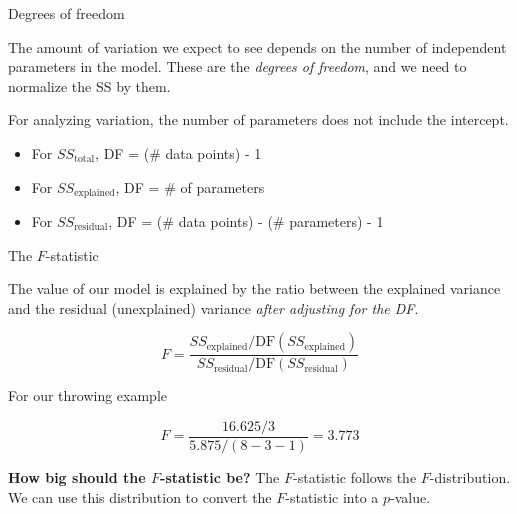\documentclass[10pt]{beamer}\usepackage[]{graphicx}\usepackage[]{color}
\newcommand\sst{SS_\mathrm{total}}
\newcommand\ssx{SS_\mathrm{explained}}
\newcommand\ssr{SS_\mathrm{residual}}
\begin{document}
\begin{frame}[fragile]{Degrees of freedom}

The amount of variation we expect to see depends on the number of independent parameters in the model. These are the \emph{degrees of freedom}, and we need to normalize the SS by them.

For analyzing variation, the number of parameters does not include the intercept.

\begin{itemize}
  \item For $\sst$, DF = (\# data points) - 1
  \item For $\ssx$, DF = \# of parameters
  \item For $\ssr$, DF = (\# data points) - (\# parameters) - 1
\end{itemize}

\end{frame}

\begin{frame}{The $F$-statistic}

The value of our model is explained by the ratio between the explained variance and the residual (unexplained) variance \emph{after adjusting for the DF}.

\[ F = \frac{\ssx / \mathrm{DF}(\ssx)}{\ssr / \mathrm{DF}(\ssr)} \]

\pause
For our throwing example

\[ F = \frac{16.625 /3}{5.875 / (8-3-1)} = 3.773 \]

\pause
\textbf{How big should the $F$-statistic be?} The $F$-statistic follows the $F$-distribution. We can use this distribution to convert the $F$-statistic into a $p$-value.

\end{frame}
\end{document}
